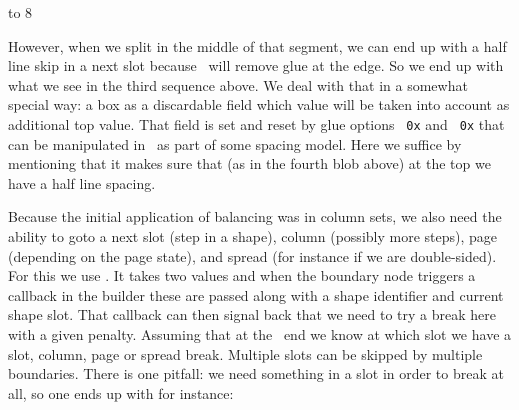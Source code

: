         \blackrule[width=\hsize,  height=\strutht,  depth=\strutdp,  color=darkgray]\par
        \blackrule[width=.2\hsize,height=.5\strutht,depth=.5\strutdp,color=darkred]\par
        \blackrule[width=\hsize,  height=\strutht,  depth=\strutdp,  color=darkgray]\par
        \blackrule[width=.6\hsize,height=\strutht,  depth=\strutdp,  color=darkgray]
        \vfill
    \egroup
    \quad
     to 8\lineheight \bgroup \forgetall \raggedcenter \offinterlineskip \hsize 3cm
        \blackrule[width=.2\hsize,height=.5\strutht,depth=.5\strutdp,color=darkred]\par
        \blackrule[width=\hsize,  height=\strutht,  depth=\strutdp,  color=darkgray]\par
        \blackrule[width=.6\hsize,height=\strutht,  depth=\strutdp,  color=middlegray]\par
        \blackrule[width=\hsize,  height=\strutht,  depth=\strutdp,  color=darkgray]\par
        \blackrule[width=.2\hsize,height=.5\strutht,depth=.5\strutdp,color=darkred]\par
        \blackrule[width=\hsize,  height=\strutht,  depth=\strutdp,  color=darkgray]\par
        \blackrule[width=.6\hsize,height=\strutht,  depth=\strutdp,  color=darkgray]
        \vfill
    \egroup
\egroup
\stoplinecorrection

However, when we split in the middle of that segment, we can end up with a half
line skip in a next slot because \TEX\ will remove glue at the edge. So we end up
with what we see in the third sequence above. We deal with that in a somewhat
special way: a box as a discardable field which value will be taken into account
as additional top value. That field is set and reset by glue options {\tt
0x\tohexadecimal {}} and {\tt
0x\tohexadecimal {}} that can
be manipulated in \LUA\ as part of some spacing model. Here we suffice by
mentioning that it makes sure that (as in the fourth blob above) at the top we
have a half line spacing.

\stopsectionlevel

\startsectionlevel[title=Forcing breaks]

Because the initial application of balancing was in column sets, we also need the
ability to goto a next slot (step in a shape), column (possibly more steps), page
(depending on the page state), and spread (for instance if we are double-sided).
For this we use \type {\balanceboundary}. It takes two values and when the
boundary node triggers a callback in the builder these are passed along with a
shape identifier and current shape slot. That callback can then signal back that
we need to try a break here with a given penalty. Assuming that at the \LUA\ end
we know at which slot we have a slot, column, page or spread break. Multiple
slots can be skipped by multiple boundaries. There is one pitfall: we need
something in a slot in order to break at all, so one ends up with for instance:

